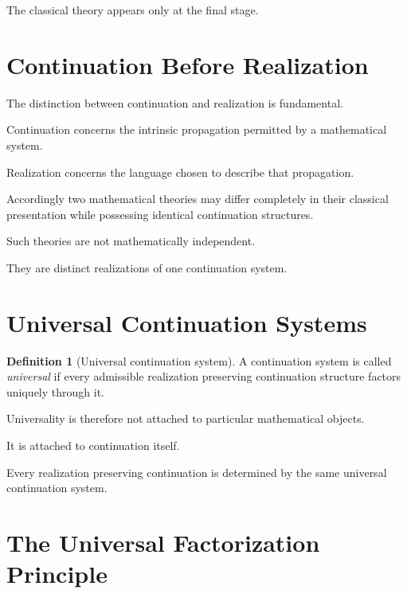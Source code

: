 \documentclass[13pt,openany]{book}
\theoremstyle{plain}
\theoremstyle{definition}
\newtheorem{definition}{Definition}[chapter]
\begin{document}
The classical theory appears only at the final stage.

\section{Continuation Before Realization}

The distinction between continuation and realization is fundamental.

Continuation concerns the intrinsic propagation permitted by a mathematical
system.

Realization concerns the language chosen to describe that propagation.

Accordingly two mathematical theories may differ completely in their classical
presentation while possessing identical continuation structures.

Such theories are not mathematically independent.

They are distinct realizations of one continuation system.

\section{Universal Continuation Systems}

\begin{definition}[Universal continuation system]
A continuation system is called \emph{universal} if every admissible realization
preserving continuation structure factors uniquely through it.
\end{definition}

Universality is therefore not attached to particular mathematical objects.

It is attached to continuation itself.

Every realization preserving continuation is determined by the same universal
continuation system.

\section{The Universal Factorization Principle}
\end{document}
